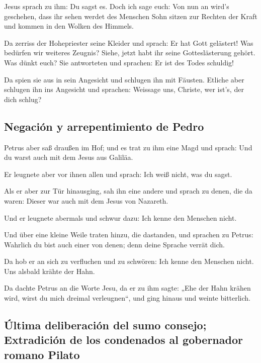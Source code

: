  Jesus sprach zu ihm: Du sagst es. Doch ich sage euch:
Von nun an wird's geschehen, dass ihr sehen werdet des Menschen Sohn
sitzen zur Rechten der Kraft und kommen in den Wolken des Himmels.

 Da zerriss der Hohepriester seine Kleider und sprach: Er
hat Gott gelästert! Was bedürfen wir weiteres Zeugnis? Siehe, jetzt habt
ihr seine Gotteslästerung gehört.  Was dünkt euch? Sie
antworteten und sprachen: Er ist des Todes schuldig!

 Da spien sie aus in sein Angesicht und schlugen ihn mit
Fäusten. Etliche aber schlugen ihn ins Angesicht  und
sprachen: Weissage uns, Christe, wer ist's, der dich schlug?

\hypertarget{negaciuxf3n-y-arrepentimiento-de-pedro}{%
\subsection{Negación y arrepentimiento de
Pedro}\label{negaciuxf3n-y-arrepentimiento-de-pedro}}

 Petrus aber saß draußen im Hof; und es trat zu ihm eine
Magd und sprach: Und du warst auch mit dem Jesus aus Galiläa.

 Er leugnete aber vor ihnen allen und sprach: Ich weiß
nicht, was du sagst.

 Als er aber zur Tür hinausging, sah ihn eine andere und
sprach zu denen, die da waren: Dieser war auch mit dem Jesus von
Nazareth.

 Und er leugnete abermals und schwur dazu: Ich kenne den
Menschen nicht.

 Und über eine kleine Weile traten hinzu, die dastanden,
und sprachen zu Petrus: Wahrlich du bist auch einer von denen; denn
deine Sprache verrät dich.

 Da hob er an sich zu verfluchen und zu schwören: Ich
kenne den Menschen nicht. Uns alsbald krähte der Hahn.

 Da dachte Petrus an die Worte Jesu, da er zu ihm sagte:
„Ehe der Hahn krähen wird, wirst du mich dreimal verleugnen``, und ging
hinaus und weinte bitterlich.

\hypertarget{uxfaltima-deliberaciuxf3n-del-sumo-consejo-extradiciuxf3n-de-los-condenados-al-gobernador-romano-pilato}{%
\subsection{Última deliberación del sumo consejo; Extradición de los
condenados al gobernador romano
Pilato}\label{uxfaltima-deliberaciuxf3n-del-sumo-consejo-extradiciuxf3n-de-los-condenados-al-gobernador-romano-pilato}}

